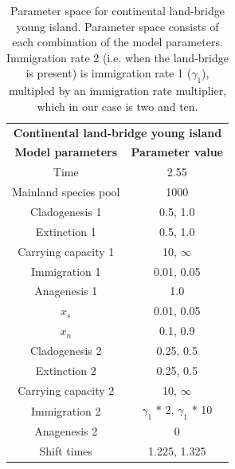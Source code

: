 \begin{table}[h]
    \centering
    \caption{Parameter space for continental land-bridge young island. Parameter space consists of each combination of the model parameters. Immigration rate 2 (i.e. when the land-bridge is present) is immigration rate 1 ($\gamma_1$), multipled by an immigration rate multiplier, which in our case is two and ten.}
    \begin{tabular}{ c | c }
        \multicolumn{2}{c}{\textbf{Continental land-bridge young island}} \\
        \textbf{Model parameters} & \textbf{Parameter value} \\ 
        \hline
        \hline
        Time & 2.55 \\
        \hline
        Mainland species pool & 1000 \\
        \hline
        Cladogenesis 1 & 0.5, 1.0 \\
        \hline
        Extinction 1 & 0.5, 1.0 \\
        \hline
        Carrying capacity 1 & 10, $\infty$ \\
        \hline
        Immigration 1 & 0.01, 0.05 \\
        \hline
        Anagenesis 1 & 1.0 \\
        \hline
        $x_s$ & 0.01, 0.05 \\
        \hline
        $x_n$ & 0.1, 0.9 \\
        \hline
        Cladogenesis 2 & 0.25, 0.5 \\
        \hline
        Extinction 2 & 0.25, 0.5 \\
        \hline
        Carrying capacity 2 & 10, $\infty$ \\
        \hline
        Immigration 2 & $\gamma_1$ * 2, $\gamma_1$ * 10 \\ 
        \hline 
        Anagenesis 2 & 0 \\
        \hline
        Shift times & 1.225, 1.325 \\
    \end{tabular}
    \label{tab:oceanic_ontogeny_sea_level_young}
\end{table}

